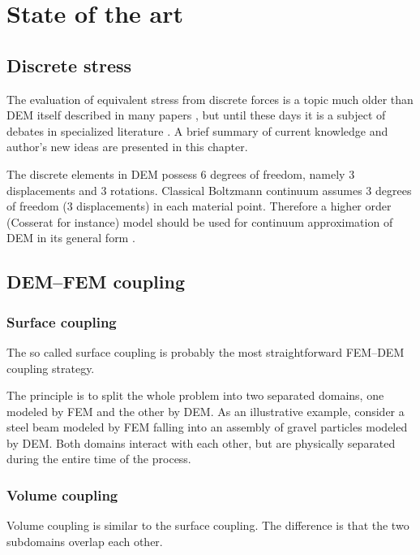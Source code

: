 \chapter{State of the art}

\section{Discrete stress}
The evaluation of equivalent stress from discrete forces is a topic much older than DEM itself \cite{Love1927a} described in many papers \cite{Alonsoarroquin2011a,ChangKuhn2005a,Bagi1996a},
but until these days it is a subject of debates in specialized literature \cite{BardetVardoulakis2001a,Bagi2003a,Kuhn2003a,BardetVardoulakis2003a,BardetVardoulakis2003b}.
A brief summary of current knowledge and author's new ideas are presented in this chapter.

The discrete elements in DEM possess 6 degrees of freedom, namely 3 displacements and 3 rotations.
Classical Boltzmann continuum assumes 3 degrees of freedom (3 displacements) in each material point.
Therefore a higher order (Cosserat for instance) model should be used for continuum approximation of DEM in its general form \cite{Alonsoarroquin2011a}.


\section{DEM--FEM coupling}

\subsection{Surface coupling}
The so called surface coupling
\cite{OnateRojek2004a,Fakhimi2009a,NakashimaOida2004a}
is probably the most straightforward FEM--DEM coupling strategy.

The principle is to split the whole problem into two separated domains, one modeled by FEM and the other by DEM.
As an illustrative example, consider a steel beam modeled by FEM falling into an assembly of gravel particles modeled by DEM.
Both domains interact with each other, but are physically separated during the entire time of the process.

\subsection{Volume coupling}
Volume coupling \cite{RousseauFranginMarinDaudville2009a,XuGracieBelytschko2002a,AzevedoLemos2006a,WellmannWriggers2012a}
is similar to the surface coupling.
The difference is that the two subdomains overlap each other.

